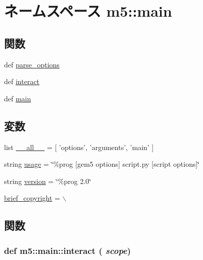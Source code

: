 \hypertarget{namespacem5_1_1main}{
\section{ネームスペース m5::main}
\label{namespacem5_1_1main}
}
\subsection*{関数}
\begin{DoxyCompactItemize}
\item 
def \hyperlink{namespacem5_1_1main_a2bce6a0d2b107fc626748115ead2278d}{parse\_\-options}
\item 
def \hyperlink{namespacem5_1_1main_a659ca203513b5e8b6629d56f817d2c56}{interact}
\item 
def \hyperlink{namespacem5_1_1main_ad7f72c0fe293565319a7f5e3a7100fcb}{main}
\end{DoxyCompactItemize}
\subsection*{変数}
\begin{DoxyCompactItemize}
\item 
list \hyperlink{namespacem5_1_1main_aa4a022e6ddacd362b83964da5cc5d044}{\_\-\_\-all\_\-\_\-} = \mbox{[} 'options', 'arguments', 'main' \mbox{]}
\item 
string \hyperlink{namespacem5_1_1main_a61e5f066c879e5430d8f713c2c3a8b31}{usage} = \char`\"{}\%prog \mbox{[}gem5 options\mbox{]} script.py \mbox{[}script options\mbox{]}\char`\"{}
\item 
string \hyperlink{namespacem5_1_1main_af9c8593b58583463efe6932e24c9d6e6}{version} = \char`\"{}\%prog 2.0\char`\"{}
\item 
\hyperlink{namespacem5_1_1main_ada1894ffa84d88fb55d34087f203ddca}{brief\_\-copyright} = $\backslash$
\end{DoxyCompactItemize}


\subsection{関数}
\hypertarget{namespacem5_1_1main_a659ca203513b5e8b6629d56f817d2c56}{
\subsubsection[{interact}]{\setlength{\rightskip}{0pt plus 5cm}def m5::main::interact ( {\em scope})}}
\label{namespacem5_1_1main_a659ca203513b5e8b6629d56f817d2c56}



